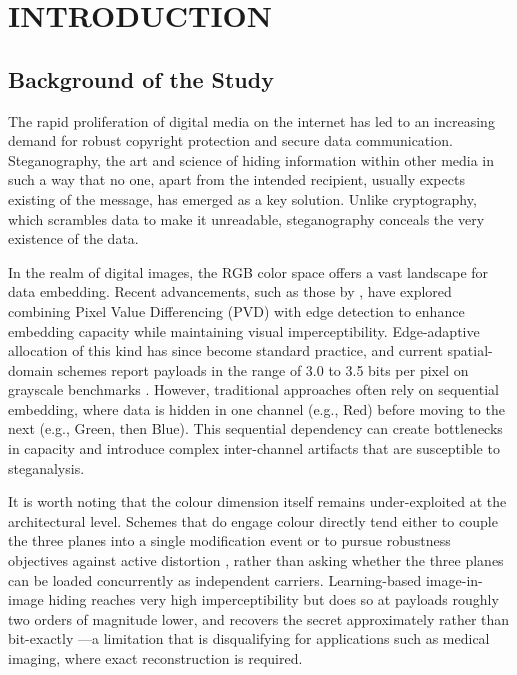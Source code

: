 \chapter{INTRODUCTION}

\section{Background of the Study}
The rapid proliferation of digital media on the internet has led to an increasing demand for robust copyright protection and secure data communication. Steganography, the art and science of hiding information within other media in such a way that no one, apart from the intended recipient, usually expects existing of the message, has emerged as a key solution. Unlike cryptography, which scrambles data to make it unreadable, steganography conceals the very existence of the data. 

In the realm of digital images, the RGB color space offers a vast landscape for data embedding. Recent advancements, such as those by \citet{liu2025color}, have explored combining Pixel Value Differencing (PVD) with edge detection to enhance embedding capacity while maintaining visual imperceptibility. Edge-adaptive allocation of this kind has since become standard practice, and current spatial-domain schemes report payloads in the range of 3.0 to 3.5 bits per pixel on grayscale benchmarks \citep{patwari2025dilatedlog, singh2026edgeopt, ismail2026edgeadaptive}. However, traditional approaches often rely on sequential embedding, where data is hidden in one channel (e.g., Red) before moving to the next (e.g., Green, then Blue). This sequential dependency can create bottlenecks in capacity and introduce complex inter-channel artifacts that are susceptible to steganalysis.

It is worth noting that the colour dimension itself remains under-exploited at the architectural level. Schemes that do engage colour directly tend either to couple the three planes into a single modification event \citep{aljburi2026emd3d} or to pursue robustness objectives against active distortion \citep{li2025colorconversion}, rather than asking whether the three planes can be loaded concurrently as independent carriers. Learning-based image-in-image hiding reaches very high imperceptibility but does so at payloads roughly two orders of magnitude lower, and recovers the secret approximately rather than bit-exactly \citep{janok2026survey, alrawashdeh2025hed}---a limitation that is disqualifying for applications such as medical imaging, where exact reconstruction is required.

